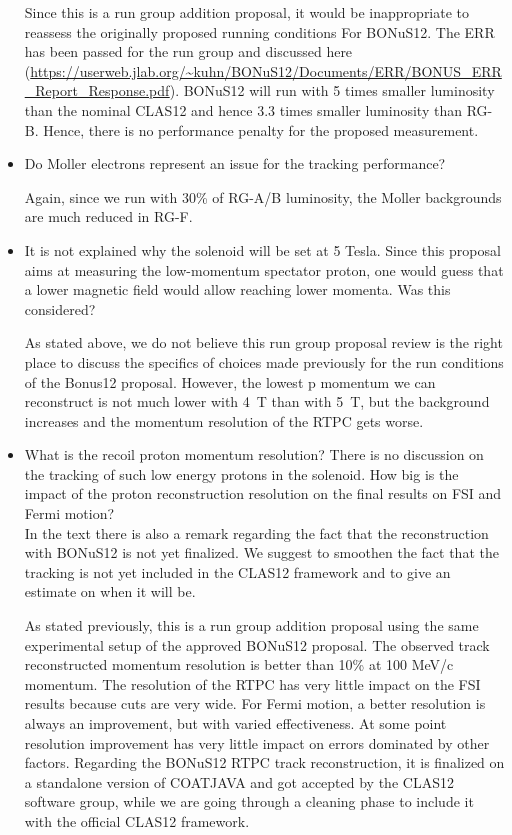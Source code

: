 \begin{itemize}
{\color{red} Since this is a run group addition proposal, it would be 
        inappropriate to reassess the originally proposed running conditions 
        For BONuS12. The ERR has been passed for the run group and discussed 
        here 
        (\url{https://userweb.jlab.org/~kuhn/BONuS12/Documents/ERR/BONUS_ERR_Report_Response.pdf}).  
        BONuS12 will run with 5 times smaller luminosity than the nominal 
        CLAS12 and hence 3.3 times smaller luminosity than RG-B. Hence, there 
        is no performance penalty for the proposed measurement.}

 \item Do Moller electrons represent an issue for the tracking performance? 

 {\color{red} Again, since we run with 30\% of RG-A/B luminosity, the Moller 
        backgrounds are much reduced in RG-F.}

 \item It is not explained why the solenoid will be set at 5 Tesla. Since this 
    proposal aims at measuring the low-momentum spectator proton, one would 
        guess that a lower magnetic field would allow reaching lower momenta.  
        Was this considered?
 
{\color{red} As stated above, we do not believe this run group proposal review 
        is the right place to discuss the specifics of choices made previously 
        for the run conditions of the Bonus12 proposal. However, the lowest p 
        momentum we can reconstruct is not much lower with 4~T than with 5~T, 
        but the background increases and the momentum resolution of the RTPC 
        gets worse.}


\item What is the recoil proton momentum resolution? There is no discussion on 
   the tracking of such low energy protons in the solenoid. How big is the 
   impact of the proton reconstruction resolution on the final results on FSI 
   and Fermi motion?\\In the text there is also a remark regarding the fact 
   that the reconstruction with BONuS12 is not yet finalized. We suggest to 
   smoothen the fact that the tracking is not yet included in the CLAS12 
   framework and to give an estimate on when it will be.
 
{\color{red} As stated previously, this is a run group addition proposal using 
the same experimental setup of the approved BONuS12 proposal. The observed 
track reconstructed momentum resolution is better than 10\% at 100 MeV/c 
momentum. The resolution of the RTPC has very little impact on the FSI results 
because cuts are very wide. For Fermi motion, a better resolution is always an 
improvement, but with varied effectiveness. At some point resolution 
improvement has very little impact on errors dominated by other factors.  
Regarding the BONuS12 RTPC track reconstruction, it is finalized on a 
standalone version of COATJAVA and got accepted by the CLAS12 software group, 
while we are going through a cleaning phase to include it with the official 
CLAS12 framework.}


\end{itemize}
